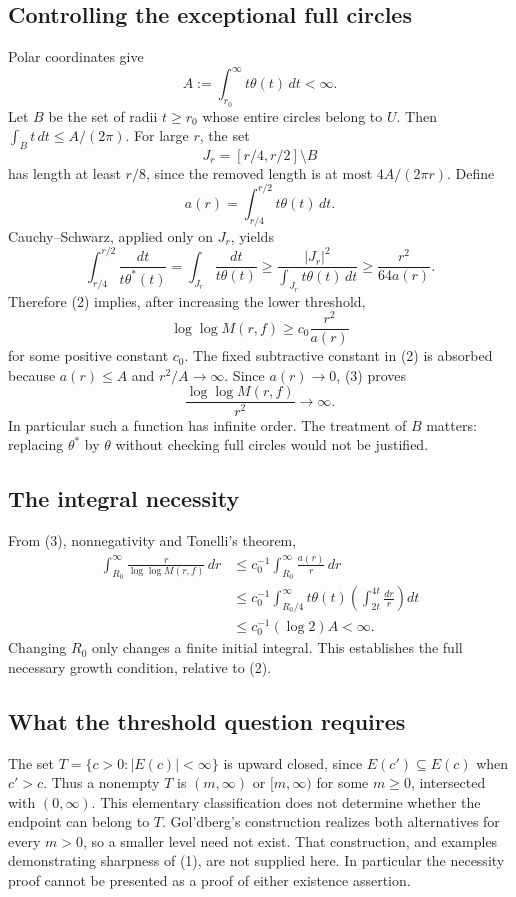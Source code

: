 \subsection*{Controlling the exceptional full circles}
Polar coordinates give
\[
 A:=\int_{r_0}^{\infty}t\theta(t)\,dt<\infty.
\]
Let $B$ be the set of radii $t\ge r_0$ whose entire circles belong to $U$. Then
$\int_B t\,dt\le A/(2\pi)$.
For large $r$, the set
\[
 J_r=[r/4,r/2]\setminus B
\]
has length at least $r/8$, since the removed length is at most
$4A/(2\pi r)$. Define
\[
 a(r)=\int_{r/4}^{r/2}t\theta(t)\,dt.
\]
Cauchy--Schwarz, applied only on $J_r$, yields
\[
 \int_{r/4}^{r/2}\frac{dt}{t\theta^*(t)}
 =\int_{J_r}\frac{dt}{t\theta(t)}
 \ge\frac{|J_r|^2}{\int_{J_r}t\theta(t)\,dt}
 \ge\frac{r^2}{64a(r)}.
\]
Therefore (2) implies, after increasing the lower threshold,
\[
 \log\log M(r,f)\ge c_0\frac{r^2}{a(r)}
 \tag{3}
\]
for some positive constant $c_0$. The fixed subtractive constant in (2) is absorbed because $a(r)\le A$ and $r^2/A\to\infty$.
Since $a(r)\to0$, (3) proves
\[
 \frac{\log\log M(r,f)}{r^2}\longrightarrow\infty.
\]
In particular such a function has infinite order. The treatment of $B$ matters: replacing $\theta^*$ by $\theta$ without checking full circles would not be justified.

\subsection*{The integral necessity}
From (3), nonnegativity and Tonelli's theorem,
\[
 \begin{split}
 \int_{R_0}^{\infty}\frac{r}{\log\log M(r,f)}\,dr
 &\le c_0^{-1}\int_{R_0}^{\infty}\frac{a(r)}r\,dr\\
 &\le c_0^{-1}\int_{R_0/4}^{\infty}
       t\theta(t)\left(\int_{2t}^{4t}\frac{dr}r\right)dt\\
 &\le c_0^{-1}(\log2)A<\infty.
 \end{split}
\]
Changing $R_0$ only changes a finite initial integral. This establishes the full necessary growth condition, relative to (2).

\subsection*{What the threshold question requires}
The set $T=\{c>0:|E(c)|<\infty\}$ is upward closed, since $E(c')\subseteq E(c)$ when $c'>c$. Thus a nonempty $T$ is $(m,\infty)$ or $[m,\infty)$ for some $m\ge0$, intersected with $(0,\infty)$. This elementary classification does not determine whether the endpoint can belong to $T$.
Gol'dberg's construction realizes both alternatives for every $m>0$, so a smaller level need not exist. That construction, and examples demonstrating sharpness of (1), are not supplied here. In particular the necessity proof cannot be presented as a proof of either existence assertion.

